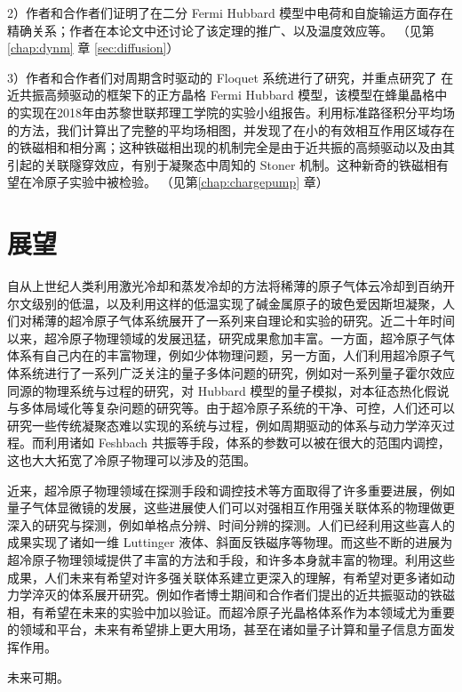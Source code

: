 2）作者和合作者们证明了在二分 Fermi Hubbard 模型中电荷和自旋输运方面存在精确关系；作者在本论文中还讨论了该定理的推广、以及温度效应等。
（见第\ref{chap:dynm} 章 \ref{sec:diffusion}）

3）作者和合作者们对周期含时驱动的 Floquet 系统进行了研究，并重点研究了
在近共振高频驱动的框架下的正方晶格 Fermi Hubbard 模型，该模型在蜂巢晶格中的实现在2018年由苏黎世联邦理工学院的实验小组报告\cite{correlated-tunnel-expr-2018-shaking}。利用标准路径积分平均场的方法，我们计算出了完整的平均场相图，并发现了在小的有效相互作用区域存在的铁磁相和相分离；这种铁磁相出现的机制完全是由于近共振的高频驱动以及由其引起的关联隧穿效应，有别于凝聚态中周知的 Stoner 机制。这种新奇的铁磁相有望在冷原子实验中被检验。
（见第\ref{chap:chargepump} 章）



\section{展望}

自从上世纪人类利用激光冷却和蒸发冷却的方法将稀薄的原子气体云冷却到百纳开尔文级别的低温，以及利用这样的低温实现了碱金属原子的玻色爱因斯坦凝聚\cite{bec1995a,bec1995b}，人们对稀薄的超冷原子气体系统展开了一系列来自理论和实验的研究。近二十年时间以来，超冷原子物理领域的发展迅猛，研究成果愈加丰富。一方面，超冷原子气体体系有自己内在的丰富物理，例如少体物理问题，另一方面，人们利用超冷原子气体系统进行了一系列广泛关注的量子多体问题的研究，例如对一系列量子霍尔效应同源的物理系统与过程的研究\cite{topo2016zoller,harper1,harper2,zak-expr-2013,chern-expr-2015,ab-expr-2015,wilsonline-expr-2016,haldane-expr-2014,charge-pump-expr-2016-de,charge-pump-expr-2016-jp,4dqhall-expr-2018}，对 Hubbard 模型的量子模拟\cite{hubbard-expan-2010,hubbard-expan-2012,microscope5,microscope6,af1,af2,af3,canted,incommensurate,af_long_range,pair_attractive,hidden_af_doped,charge-diffusion,spin-diffusion,floq-hubb-expr-2018,correlated-tunnel-expr-2018-shaking,correlated-tunnel-expr-2018-raman}，对本征态热化假说\cite{thermalize-entropy-2016}与多体局域化\cite{mbl1d,mbl2d}等复杂问题的研究等。由于超冷原子系统的干净、可控，人们还可以研究一些传统凝聚态难以实现的系统与过程，例如周期驱动的体系\cite{haldane-expr-2014,floq-hubb-expr-2018,correlated-tunnel-expr-2018-shaking}与动力学淬灭过程。而利用诸如 Feshbach 共振等手段，体系的参数可以被在很大的范围内调控，这也大大拓宽了冷原子物理可以涉及的范围。

近来，超冷原子物理领域在探测手段和调控技术等方面取得了许多重要进展，例如量子气体显微镜的发展，这些进展使人们可以对强相互作用强关联体系的物理做更深入的研究与探测，例如单格点分辨、时间分辨的探测。人们已经利用这些喜人的成果实现了诸如一维 Luttinger 液体\cite{hidden_af_doped}、斜面反铁磁序\cite{canted}等物理。而这些不断的进展为超冷原子物理领域提供了丰富的方法和手段，和许多本身就丰富的物理。利用这些成果，人们未来有希望对许多强关联体系建立更深入的理解，有希望对更多诸如动力学淬灭的体系展开研究。例如作者博士期间和合作者们提出的近共振驱动的铁磁相\cite{floqhubb}，有希望在未来的实验中加以验证。而超冷原子光晶格体系作为本领域尤为重要的领域和平台，未来有希望排上更大用场，甚至在诸如量子计算和量子信息方面发挥作用\cite{bloch2012}。

未来可期。